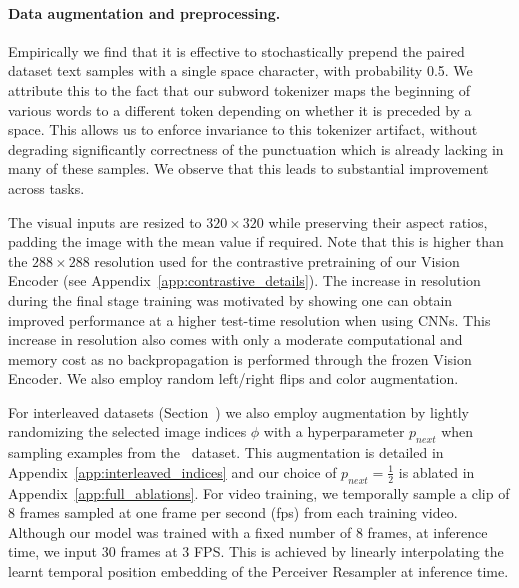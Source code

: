 \paragraph{Data augmentation and preprocessing.}
Empirically we find that it is effective to stochastically prepend the paired dataset text samples with a single space character, with probability 0.5.
We attribute this to the fact that our subword tokenizer maps the beginning of various words to a different token depending on whether it is preceded by a space.
This allows us to enforce invariance to this tokenizer artifact, without degrading significantly correctness of the punctuation which is already lacking in many of these samples. We observe that this leads to substantial improvement across tasks.

The visual inputs are resized to $320\times320$ while preserving their aspect ratios, padding the image with the mean value if required.
Note that this is higher than the $288\times288$ resolution used for the contrastive pretraining of our Vision Encoder (see Appendix~\ref{app:contrastive_details}).
The increase in resolution during the final stage training was motivated by \cite{touvron2019fixing}  showing one can obtain improved performance at a higher test-time resolution when using CNNs.
This increase in resolution also comes with only a moderate computational and memory cost as no backpropagation is performed through the frozen Vision Encoder.
We also employ random left/right flips and color augmentation.

For interleaved datasets (Section~) we also employ augmentation by lightly randomizing the selected image indices $\phi$ with a hyperparameter $p_{next}$ when sampling examples from the~\mmmw{} dataset.
This augmentation is detailed in Appendix~\ref{app:interleaved_indices} and our choice of $p_{next}=\tfrac{1}{2}$ is ablated in Appendix~\ref{app:full_ablations}.
For video training, we temporally sample a clip of 8 frames sampled at one frame per second (fps) from each training video.
Although our model was trained with a fixed number of 8 frames, at inference time, we input 30 frames at 3 FPS.
This is achieved by linearly interpolating the learnt temporal position embedding of the Perceiver Resampler at inference time.

